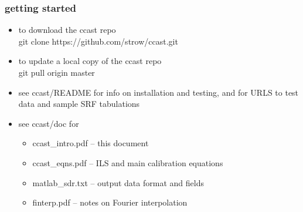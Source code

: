 \documentclass[11pt]{beamer}
\begin{document}
\begin{frame}
\frametitle{getting started}

\begin{itemize} 
   \item to download the ccast repo \\ 
     \hspace{10pt} git clone https://github.com/strow/ccast.git
   \item to update a local copy of the ccast repo \\ 
     \hspace{10pt} git pull origin master
   \item see ccast/README for info on installation and testing, and
     for URLS to test data and sample SRF tabulations
   \item see ccast/doc for
     \begin{itemize}
       \item ccast\_intro.pdf -- this document
       \item ccast\_eqns.pdf -- ILS and main calibration equations
       \item matlab\_sdr.txt -- output data format and fields
       \item finterp.pdf -- notes on Fourier interpolation
     \end{itemize} 
\end{itemize} 

\end{frame}
\end{document}
